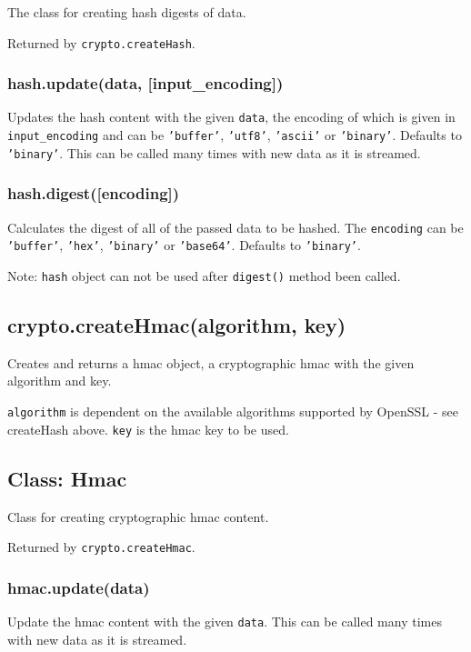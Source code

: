 The class for creating hash digests of data.

Returned by \texttt{crypto.createHash}.

\subsubsection{hash.update(data, {[}input\_encoding{]})}

Updates the hash content with the given \texttt{data}, the encoding of
which is given in \texttt{input\_encoding} and can be \texttt{'buffer'},
\texttt{'utf8'}, \texttt{'ascii'} or \texttt{'binary'}. Defaults to
\texttt{'binary'}. This can be called many times with new data as it is
streamed.

\subsubsection{hash.digest({[}encoding{]})}

Calculates the digest of all of the passed data to be hashed. The
\texttt{encoding} can be \texttt{'buffer'}, \texttt{'hex'},
\texttt{'binary'} or \texttt{'base64'}. Defaults to \texttt{'binary'}.

Note: \texttt{hash} object can not be used after \texttt{digest()}
method been called.

\subsection{crypto.createHmac(algorithm, key)}

Creates and returns a hmac object, a cryptographic hmac with the given
algorithm and key.

\texttt{algorithm} is dependent on the available algorithms supported by
OpenSSL - see createHash above. \texttt{key} is the hmac key to be used.

\subsection{Class: Hmac}

Class for creating cryptographic hmac content.

Returned by \texttt{crypto.createHmac}.

\subsubsection{hmac.update(data)}

Update the hmac content with the given \texttt{data}. This can be called
many times with new data as it is streamed.

